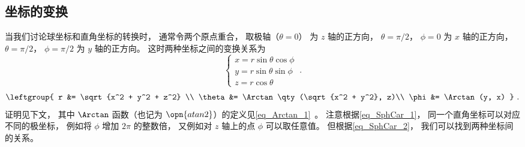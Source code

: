 

\subsection{坐标的变换}
当我们讨论球坐标和直角坐标的转换时， 通常令两个原点重合， 取极轴（$\theta = 0$） 为 $z$ 轴的正方向， $\theta = \pi/2$， $\phi = 0$ 为 $x$ 轴的正方向， $\theta = \pi/2$， $\phi = \pi/2$ 为 $y$ 轴的正方向。 这时两种坐标之间的变换关系为
\begin{equation}\label{eq_SphCar_1}
\begin{cases}
x = r\sin \theta \cos \phi \\
y = r\sin \theta \sin \phi \\
z = r\cos \theta 
\end{cases}~.
\end{equation}
\begin{equation}\label{eq_SphCar_2}
\leftgroup{
r &= \sqrt {x^2 + y^2 + z^2} \\
\theta  &= \Arctan\qty(\sqrt{x^2 + y^2}, z)\\
\phi  &= \Arctan(y, x)
}~.\end{equation}
证明见下文， 其中 $\Arctan$ 函数（也记为 $\opn{atan2}$）的定义见\autoref{eq_Arctan_1}~。 注意根据\autoref{eq_SphCar_1}， 同一个直角坐标可以对应不同的极坐标， 例如将 $\phi$ 增加 $2\pi$ 的整数倍， 又例如对 $z$ 轴上的点 $\phi$ 可以取任意值。 但根据\autoref{eq_SphCar_2}， 我们可以找到两种坐标间的关系。

